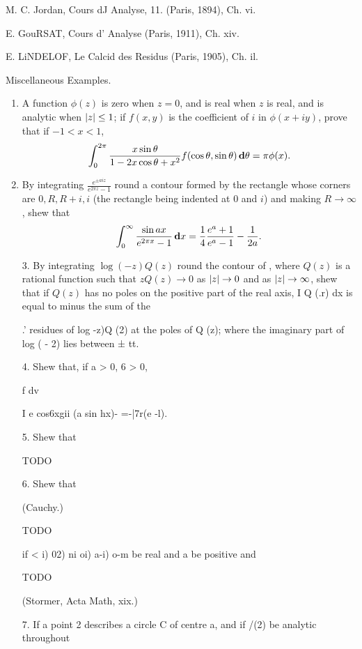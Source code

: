 M. C. Jordan, Cours dJ Analyse, 11. (Paris, 1894), Ch. vi.

E. GouRSAT, Cours d' Analyse (Paris, 1911), Ch. xiv.

E. LiNDELOF, Le Calcid des Residus (Paris, 1905), Ch. il.

%
%

Miscellaneous Examples.
\begin{enumerate}
\item  A function $\phi(z)$ is zero when $z=0$, and is real when $z$
  is real, and is analytic when $\left| z \right| \leq 1$; if $f(x,y)$ is
  the coefficient of $i$ in $\phi(x + iy)$, prove that if $-1 < x < 1$,
  $$
  \int_{0}^{2\pi}
  \frac{x \sin\theta }{ 1 - 2x\cos\theta + x^{2}}
  f(\cos\theta, \sin\theta)
  \, \mathbf{d}\theta
  =
  \pi \phi(x).
  $$
\item
  By integrating $\frac{e^{\pm aiz}}{e^{2\pi z}-1}$ round a contour formed by the rectangle whose
corners are $0, R, R+i, i$ (the rectangle being indented at $0$ and
$i$) and making $R\rightarrow\infty$,
shew that
$$
\int_{0}^{\infty}
\frac{ \sin ax }{e^{2 \pi x} - 1}
\, \mathbf{d} x
=
\frac{1}{4}
\frac{ e^{a} + 1 }{ e^{a} - 1 }
-
\frac{1}{2a}.
$$

3. By integrating $\log (-z) Q(z)$ round the contour of
, where $Q(z)$ is a rational function such
that  $z Q(z) \rightarrow 0$ as $\left| z \right| \rightarrow 0$ and as
$\left| z \right| \rightarrow \infty$, shew that if $Q(z)$ has no poles 
on the positive part of the real axis, I Q (.r) dx is equal to minus
the sum of the

.' residues of log -z)Q (2) at the poles of Q (z); where the
imaginary part of log ( - 2) lies between ± tt.

4. Shew that, if a > 0, 6 > 0,

f dv

I e cos6xgii (a sin hx)- =-|7r(e -l).

5. Shew that

TODO

6. Shew that

(Cauchy.)

TODO

if < i) 02)  ni oi) a-i) o-m be real and a be positive and

TODO

(Stormer, Acta Math, xix.)

7. If a point 2 describes a circle C of centre a, and if /(2) be
analytic throughout


\end{enumerate}
